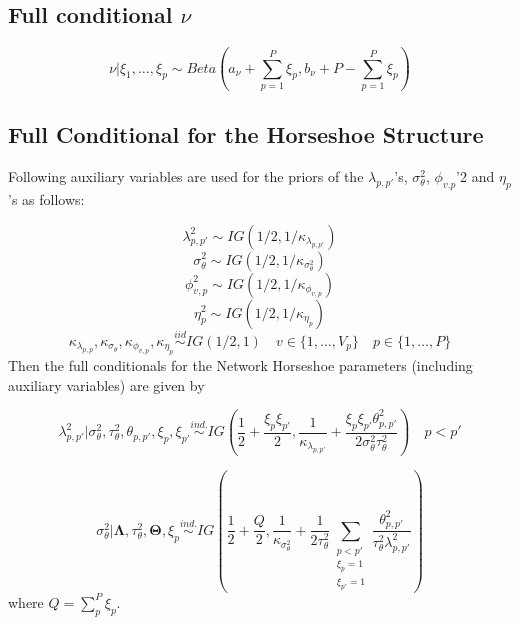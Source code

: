 \documentclass[
]{article}
\begin{document}
\subsection{\texorpdfstring{Full conditional \(\nu\)}{Full conditional \textbackslash nu}}\label{full-conditional-nu}

\[ \nu|\xi_1,\ldots,\xi_p \sim Beta \left(a_\nu + \sum_{p=1}^P \xi_p, b_{\nu}+P-\sum_{p=1}^P \xi_p \right) \]

\subsection{Full Conditional for the Horseshoe Structure}\label{full-conditional-for-the-horseshoe-structure}

Following \citep{makalic_simple_2016} auxiliary variables are used for the priors of
the \(\lambda_{p,p'}\)'s, \(\sigma^2_\theta\), \(\phi_{v.p}\)'2 and \(\eta_p\)'s as
follows:

\[ \lambda^2_{p,p'} \sim IG(1/2, 1/\kappa_{\lambda_{p,p'}}) \]
\[ \sigma^2_\theta \sim IG(1/2, 1/\kappa_{\sigma^2_\theta}) \]
\[ \phi^2_{v,p} \sim IG(1/2, 1/\kappa_{\phi_{v,p}}) \]
\[ \eta^2_p \sim IG(1/2, 1/\kappa_{\eta_p}) \]
\[ \kappa_{\lambda_{p,p}}, \kappa_{\sigma_\theta}, \kappa_{\phi_{v,p}}, \kappa_{\eta_p} \stackrel{iid}{\sim} IG(1/2, 1) \quad v \in \{1,\ldots,V_p\} \quad p \in \{1,\ldots,P\} \]
Then the full conditionals for the Network Horseshoe parameters (including auxiliary variables) are given by

\begin{equation}
\lambda^2_{p,p'}| \sigma^2_\theta, \tau^2_\theta, \theta_{p,p'}, \xi_p, \xi_{p'} \stackrel{ind.}{\sim}
IG \left(\frac{1}{2} + \frac{\xi_p\xi_{p'}}{2}, \frac{1}{\kappa_{\lambda_{p,p'}}}+\frac{\xi_p\xi_{p'}\theta^2_{p,p'}}{2 \sigma^2_\theta \tau^2_\theta}\right) \quad p<p'
\label{eq:horseshoeLambda}
\end{equation}

\begin{equation}
\sigma^2_\theta|  {\boldsymbol \Lambda} , \tau^2_\theta,  {\boldsymbol \Theta} , \xi_p \stackrel{ind.}{\sim} IG \left(\frac{1}{2} + \frac{Q}{2}, \frac{1}{\kappa_{\sigma^2_\theta}} + \frac{1}{2 \tau^2_\theta} \sum_{\substack{p<p' \\ \xi_p = 1 \\ \xi_{p'}=1}}\frac{\theta_{p,p'}^2}{\tau^2_{\theta}\lambda^2_{p,p'}} \right)
\label{eq:horseshoeSigma}
\end{equation}
where \(Q=\sum_p^{P}\xi_p\).
\end{document}
